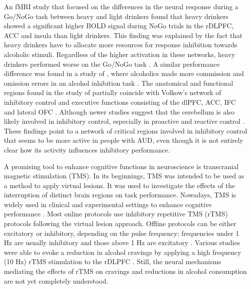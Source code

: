 \documentclass[12pt]{article}
\begin{document}
An fMRI study that focused on the differences in the neural response during a Go/NoGo task between heavy and light drinkers found that heavy drinkers showed a significant higher BOLD signal during NoGo trials in the rDLPFC, ACC and insula than light drinkers. This finding was explained by the fact that heavy drinkers have to allocate more resources for response inhibition towards alcoholic stimuli. Regardless of the higher activation in these networks, heavy drinkers performed worse on the Go/NoGo task \parencite{amesNeuralCorrelatesGo2014}. A similar performance difference was found in a study of \textcite{noelAlcoholCuesIncrease2007}, where alcoholics made more commission and omission errors in an alcohol inhibition task \parencite{noelAlcoholCuesIncrease2007}. The anatomical and functional regions found in the study of \textcite{amesNeuralCorrelatesGo2014} partially coincide with Volkow's network of inhibitory control and executive functions consisting of the dlPFC, ACC, IFC and lateral OFC \parencite{volkowAddictionScienceUncovering2014}. Although newer studies suggest that the cerebellum is also likely involved in inhibitory control, especially in proactive and reactive control \parencite{clarkCerebellarContributionsProactive2020}. These findings point to a network of critical regions involved in inhibitory control that seems to be more active in people with AUD, even though it is not entirely clear how its activity influences inhibitory performance.

A promising tool to enhance cognitive functions in neuroscience is transcranial magnetic stimulation (TMS). In its beginnings, TMS was intended to be used as a method to apply virtual lesions. It was used to investigate the effects of the interruption of distinct brain regions on task performance. Nowadays, TMS is widely used in clinical and experimental settings to enhance cognitive performance \parencite{luberEnhancementHumanCognitive2014}. Most online protocols use inhibitory repetitive TMS (rTMS) protocols following the virtual lesion approach. Offline protocols can be either excitatory or inhibitory, depending on the pulse frequency; frequencies under 1 Hz are usually inhibitory and those above 1 Hz are excitatory \parencite{beynelEffectsOnlineRepetitive2019}. Various studies were able to evoke a reduction in alcohol cravings by applying a high frequency (10 Hz) rTMS stimulation to the rDLPFC \parencite{antonelliTranscranialMagneticStimulation2021}. Still, the neural mechanisms mediating the effects of rTMS on cravings and reductions in alcohol consumption are not yet completely understood. 
\end{document}
